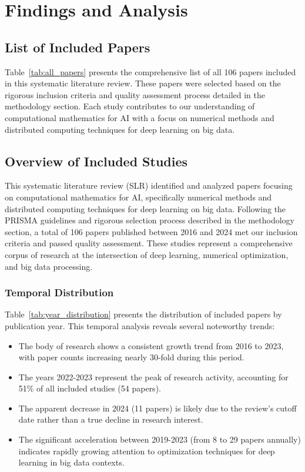 \section{Findings and Analysis}

\subsection{List of Included Papers}
Table~\ref{tab:all_papers} presents the comprehensive list of all 106 papers included in this systematic literature review. These papers were selected based on the rigorous inclusion criteria and quality assessment process detailed in the methodology section. Each study contributes to our understanding of computational mathematics for AI with a focus on numerical methods and distributed computing techniques for deep learning on big data.




\subsection{Overview of Included Studies}
This systematic literature review (SLR) identified and analyzed papers focusing on computational mathematics for AI, specifically numerical methods and distributed computing techniques for deep learning on big data. Following the PRISMA guidelines and rigorous selection process described in the methodology section, a total of 106 papers published between 2016 and 2024 met our inclusion criteria and passed quality assessment. These studies represent a comprehensive corpus of research at the intersection of deep learning, numerical optimization, and big data processing.

\subsubsection{Temporal Distribution}
Table~\ref{tab:year_distribution} presents the distribution of included papers by publication year. This temporal analysis reveals several noteworthy trends:



\begin{itemize}
    \item The body of research shows a consistent growth trend from 2016 to 2023, with paper counts increasing nearly 30-fold during this period.
    \item The years 2022-2023 represent the peak of research activity, accounting for 51\% of all included studies (54 papers).
    \item The apparent decrease in 2024 (11 papers) is likely due to the review's cutoff date rather than a true decline in research interest.
    \item The significant acceleration between 2019-2023 (from 8 to 29 papers annually) indicates rapidly growing attention to optimization techniques for deep learning in big data contexts.
\end{itemize}

